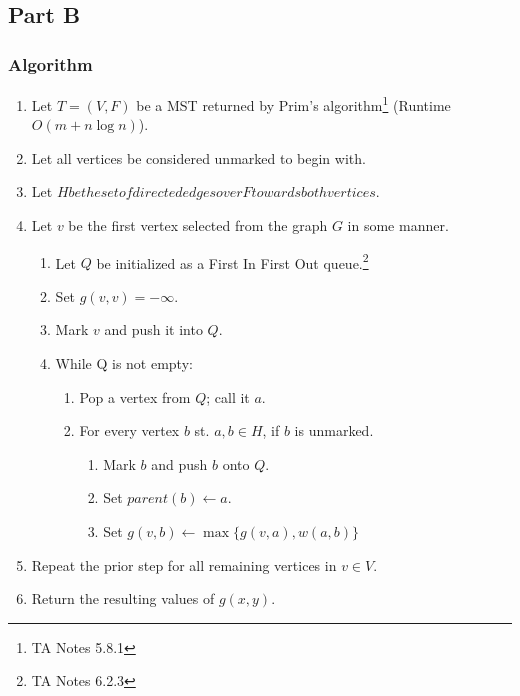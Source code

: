 \documentclass{article}
\begin{document}
\subsection{Part B}
\subsubsection{Algorithm}
\begin{enumerate}
      \item Let \(T = (V, F )\) be a MST returned by Prim's algorithm\footnote{TA
            Notes 5.8.1} (Runtime \(O(m + n \log n)\)).
      \item Let all vertices be considered unmarked to begin with.
      \item Let \(H be the set of directed edges over F towards both vertices\).
      \item Let \(v\) be the first vertex selected from the graph \(G\) in some manner.\begin{enumerate}
                  \item Let \(Q\) be initialized as a First In First Out queue.\footnote{TA Notes 6.2.3}
                  \item Set \(g(v,v) = -\infty \).
                  \item Mark \(v\) and push it into \(Q\).
                  \item While Q is not empty:\begin{enumerate}
                              \item Pop a vertex from \(Q\); call it \(a\).
                              \item For every vertex \(b\) st. \(a, b \in H\), if \(b\) is unmarked.
                                    \begin{enumerate}
                                          \item Mark \(b\) and push \(b\) onto \(Q\).
                                          \item Set \(parent(b) \leftarrow a\).
                                          \item Set \(g(v, b) \leftarrow \max \{ g(v,a) , w(a,b) \} \)
                                    \end{enumerate}
                        \end{enumerate}
            \end{enumerate}
      \item Repeat the prior step for all remaining vertices in \(v \in V\).
      \item Return the resulting values of \(g(x,y)\).
\end{enumerate}
\end{document}
